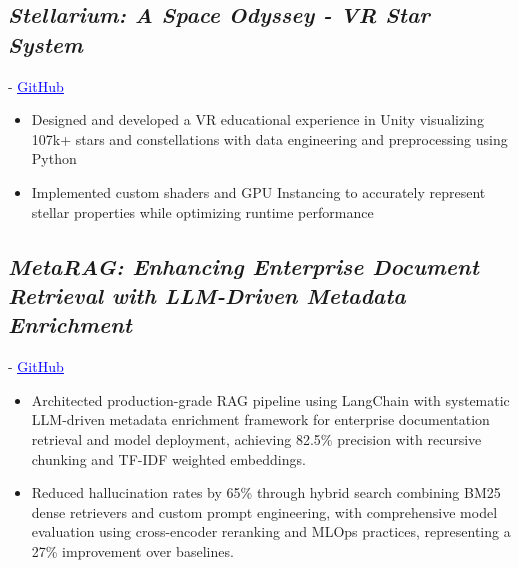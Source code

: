 \subsection{\sl {\bfseries Stellarium: A Space Odyssey - VR Star System} }  -
\href{https://github.com/PranavMishra17/VRAssignment1_CS528_UIC/tree/main}{\textcolor{blue}{\underline{GitHub }}}
\begin{itemize}
    \item Designed and developed a VR educational experience in Unity visualizing 107k+ stars and constellations with data engineering and preprocessing using Python
    \item Implemented custom shaders and GPU Instancing to accurately represent stellar properties while optimizing runtime performance
\end{itemize}
\subsection{\sl {\bfseries MetaRAG: Enhancing Enterprise Document Retrieval with LLM-Driven Metadata Enrichment}}   -
\href{https://github.com/PranavMishra17/Metadata-Enrichment-with-LLMs-for-RAGs-Internal-Knowledge-Retrieval}{\textcolor{blue}{\underline{GitHub }}}
\begin{itemize}
\item Architected production-grade RAG pipeline using LangChain with systematic LLM-driven metadata enrichment framework for enterprise documentation retrieval and model deployment, achieving 82.5\% precision with recursive chunking and TF-IDF weighted embeddings.
\item Reduced hallucination rates by 65\% through hybrid search combining BM25 dense retrievers and custom prompt engineering, with comprehensive model evaluation using cross-encoder reranking and MLOps practices, representing a 27\% improvement over baselines.
\end{itemize}
